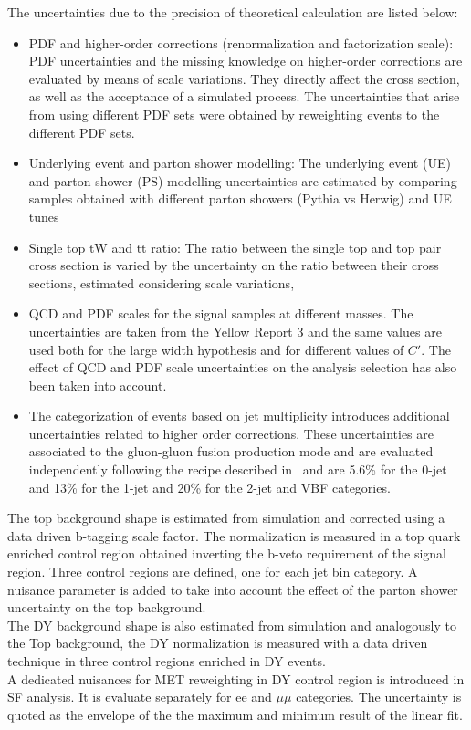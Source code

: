 The uncertainties due to the precision of theoretical calculation are listed below: 

\begin{itemize}
\item PDF and higher-order corrections (renormalization and factorization scale): PDF
uncertainties and the missing knowledge on higher-order corrections are evaluated by
means of scale variations. They directly affect the cross section, as well as the acceptance
of a simulated process. The uncertainties that arise from using different PDF sets
were obtained by reweighting events to the different PDF sets.

\item Underlying event and parton shower modelling: The underlying event (UE) and
parton shower (PS) modelling uncertainties are estimated by comparing samples
obtained with different parton showers (Pythia vs Herwig) and UE tunes

\item Single top tW and tt ratio: The ratio between the single top and top pair cross section
is varied by the uncertainty on the ratio between their cross sections, estimated considering scale variations,

\item QCD and PDF scales for the signal samples at different masses. The uncertainties are taken from the Yellow Report 3 and the same values are used both for the large width hypothesis and for different values of $C'$. The effect of QCD and PDF scale uncertainties on the analysis selection has also been taken into account.

\item The categorization of events based on jet multiplicity introduces additional uncertainties related to higher order corrections. These uncertainties are associated to the gluon-gluon fusion production mode and are evaluated independently following the recipe described in~\cite{Boughezal:2013oha} and are 5.6\% for the 0-jet and  13\% for the 1-jet and 20\% for the 2-jet and VBF categories.




\end{itemize}



The top background shape is estimated from simulation and corrected using a data driven b-tagging scale factor. The normalization is measured in a top quark enriched control region obtained inverting the b-veto requirement of the signal region. Three control regions are defined, one for each jet bin category. 
A nuisance parameter is added to take into account the effect of the parton shower uncertainty on the top background. \\
The DY background shape is also estimated from simulation and analogously to the Top background, the DY normalization is measured with a data driven technique in three control regions enriched in DY events.\\
A dedicated nuisances for MET reweighting in DY control region is introduced in SF analysis. It is evaluate separately for ee and $\mu \mu$ categories. 
The uncertainty is quoted as the envelope of the the maximum and minimum result of the linear fit.

